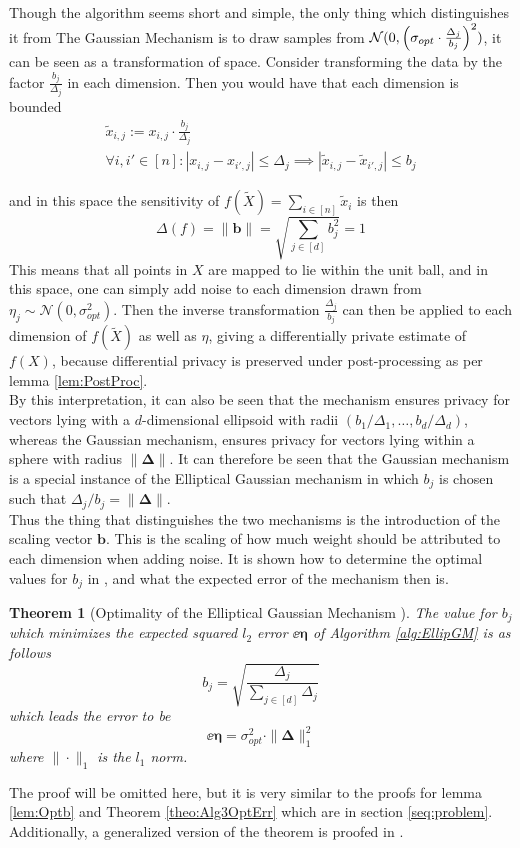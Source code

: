 \documentclass[a4paper,12pt]{article}
\newtheorem{theorem}{Theorem}
\begin{document}
Though the algorithm seems short and simple, the only thing which distinguishes it from The Gaussian Mechanism 
is to draw samples from $\mathcal{N}(0, \left (\sigma_{opt} \cdot \frac{\Delta_j}{b_j}\right)^2)$, 
it can be seen as a transformation of space. Consider transforming the data by the factor $\frac{b_j}{\Delta_j}$ in each dimension. 
Then you would have that each dimension is bounded
\begin{gather*}
    \tilde{x}_{i,j} := x_{i,j} \cdot \frac{b_j}{\Delta_j} \\
    \forall i,i' \in [n] : |x_{i,j} - x_{i',j}| \le \Delta_j \implies |\tilde{x}_{i,j} - \tilde{x}_{i',j}| \le b_j
\end{gather*}

and in this space the sensitivity of $f(\tilde{X})= \sum_{i \in [n]} \tilde{x}_i$ is then
\[
    \Delta(f) = \|\bm{b}\| = \sqrt{\sum_{j \in [d]} b_j^2} =  1
\]
This means that all points in $X$ are mapped to lie within the unit ball, and in this space, one can simply add noise to each 
dimension drawn from $\eta_j \sim \mathcal{N}(0, \sigma_{opt}^2)$. Then the inverse transformation $\frac{\Delta_j}{b_j}$ 
can then be applied to each dimension of $f(\tilde{X})$ as well as $\eta$, giving a differentially private estimate of $f(X)$, 
because differential privacy is preserved under post-processing as per lemma \ref{lem:PostProc}. \\


By this interpretation, it can also be seen that the mechanism ensures privacy for vectors lying with a $d$-dimensional
ellipsoid with radii $(b_1/\Delta_1, \dots, b_d/\Delta_d)$, 
whereas the Gaussian mechanism, ensures privacy for vectors lying within a sphere with radius $\| \bm{\Delta} \|$.
It can therefore be seen that the Gaussian mechanism is a special instance of the Elliptical Gaussian mechanism
in which $b_j$ is chosen such that $\Delta_j/b_j = \| \bm{\Delta} \|$. \\
Thus the thing that distinguishes the two mechanisms is the introduction of the scaling vector $\bm{b}$.
This is the scaling of how much weight should be attributed to each dimension when adding noise. It is shown how to determine the optimal values for $b_j$
in \cite{Lebeda2022}, and what the expected error of the mechanism then is.

\begin{theorem}[Optimality of the Elliptical Gaussian Mechanism ]
The value for $b_j$ which minimizes the expected squared $l_2$ error $\ee{\bm{\eta}}$ of Algorithm \ref{alg:EllipGM} is as follows
\[
    b_j = \sqrt{\frac{\Delta_j}{\sum_{j \in [d]} \Delta_j}}
\]
which leads the error to be
\begin{equation}
\label{eq:EGMErr}
    \ee{\bm{\eta}} =  \sigma_{opt}^2 \cdot \| \bm{\Delta} \|_1^2
\end{equation}
where $\| \cdot \|_1$ is the $l_1$ norm.

\end{theorem}
The proof will be omitted here, but it is very similar to the proofs for lemma \ref{lem:Optb} and Theorem \ref{theo:Alg3OptErr} which are in section \ref{seq:problem}.
Additionally, a generalized version of the theorem is proofed in \cite{Lebeda2022}.
\end{document}
